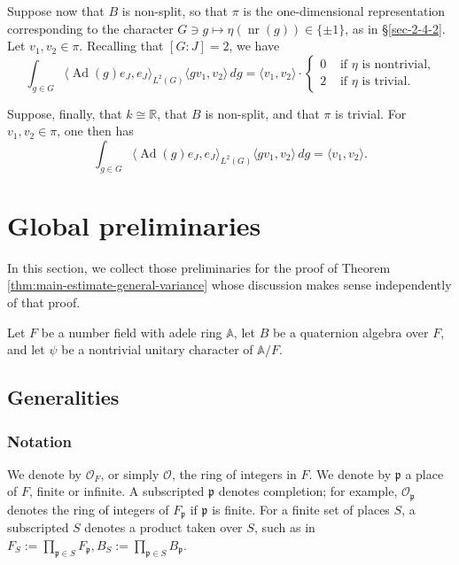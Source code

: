 \documentclass[reqno,10pt]{amsart}
\theoremstyle{plain} %
\theoremstyle{definition}
\theoremstyle{plain} %
\theoremstyle{remark}
\theoremstyle{itplain} %
\theoremstyle{remark} %
\numberwithin{equation}{section}
\DeclareMathOperator{\Ad}{Ad}
\DeclareMathOperator{\nr}{nr}
\begin{document}
Suppose now that $B$ is non-split, so that $\pi$ is the one-dimensional representation corresponding to the character $G \ni g \mapsto \eta(\nr(g)) \in \{\pm 1\}$, as in \S\ref{sec-2-4-2}.  Let $v_1,v_2 \in \pi$.  Recalling that $[G:J] = 2$, we have
\begin{equation}\label{eqn:local-rallis-ipf-integral-nonsplit-finite}
  \int_{g \in G} \langle \Ad(g) e_J, e_J \rangle_{L^2(G)}
  \langle g v_1, v_2 \rangle \,d g 
  =
  \langle v_1, v_2 \rangle
  \cdot 
  \begin{cases}
    0 & \text{ if $\eta$ is nontrivial,} \\
    2 & \text{ if $\eta$ is trivial.}
  \end{cases}
\end{equation}

Suppose, finally, that $k \cong \mathbb{R}$, that $B$ is non-split, and that $\pi$ is trivial.  For $v_1,v_2 \in \pi$, one then has
\begin{equation}\label{eqn:local-rallis-ipf-integral-nonsplit-real}
  \int_{g \in G} \langle \Ad(g) e_J, e_J \rangle_{L^2(G)}
  \langle g v_1, v_2 \rangle \,d g 
  =
  \langle v_1, v_2 \rangle.
\end{equation}




\section{Global preliminaries}
\label{sec-3}
In this section, we collect those preliminaries for the proof of Theorem \ref{thm:main-estimate-general-variance} whose discussion makes sense independently of that proof.

Let $F$ be a number field with adele ring $\mathbb{A}$, let $B$ be a quaternion algebra over $F$, and let $\psi$ be a nontrivial unitary character of $\mathbb{A}/F$.


\subsection{Generalities}
\label{sec-3-1}
\subsubsection{Notation}
\label{sec-3-1-1}
We denote by $\mathcal{O}_F$, or simply $\mathcal{O}$, the ring of integers in $F$.  We denote by $\mathfrak{p}$ a place of $F$, finite or infinite.  A subscripted $\mathfrak{p}$ denotes completion; for example, $\mathcal{O}_\mathfrak{p}$ denotes the ring of integers of $F_{\mathfrak{p}}$ if $\mathfrak{p}$ is finite.  For a finite set of places $S$, a subscripted $S$ denotes a product taken over $S$, such as in $F_S := \prod_{\mathfrak{p} \in S} F_\mathfrak{p}, B_S := \prod_{\mathfrak{p} \in S} B_\mathfrak{p}$.
\end{document}
